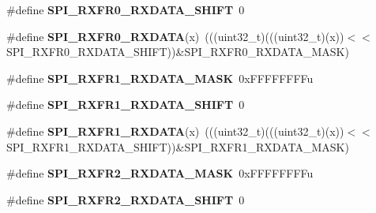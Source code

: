 \begin{DoxyCompactItemize}
\item 
\#define {\bfseries S\+P\+I\+\_\+\+R\+X\+F\+R0\+\_\+\+R\+X\+D\+A\+T\+A\+\_\+\+S\+H\+I\+FT}~0\hypertarget{group__SPI__Register__Masks_ga030988e177b7d3ab914b5bb4cd734463}{}\label{group__SPI__Register__Masks_ga030988e177b7d3ab914b5bb4cd734463}

\item 
\#define {\bfseries S\+P\+I\+\_\+\+R\+X\+F\+R0\+\_\+\+R\+X\+D\+A\+TA}(x)~(((uint32\+\_\+t)(((uint32\+\_\+t)(x))$<$$<$S\+P\+I\+\_\+\+R\+X\+F\+R0\+\_\+\+R\+X\+D\+A\+T\+A\+\_\+\+S\+H\+I\+FT))\&S\+P\+I\+\_\+\+R\+X\+F\+R0\+\_\+\+R\+X\+D\+A\+T\+A\+\_\+\+M\+A\+SK)\hypertarget{group__SPI__Register__Masks_gaefa909022ef28f93b77915a01f7456c6}{}\label{group__SPI__Register__Masks_gaefa909022ef28f93b77915a01f7456c6}

\item 
\#define {\bfseries S\+P\+I\+\_\+\+R\+X\+F\+R1\+\_\+\+R\+X\+D\+A\+T\+A\+\_\+\+M\+A\+SK}~0x\+F\+F\+F\+F\+F\+F\+F\+Fu\hypertarget{group__SPI__Register__Masks_gae5778ef350adb171937498b1b49ffdb0}{}\label{group__SPI__Register__Masks_gae5778ef350adb171937498b1b49ffdb0}

\item 
\#define {\bfseries S\+P\+I\+\_\+\+R\+X\+F\+R1\+\_\+\+R\+X\+D\+A\+T\+A\+\_\+\+S\+H\+I\+FT}~0\hypertarget{group__SPI__Register__Masks_gab6747e932cee7cbdab3b46213f8d793b}{}\label{group__SPI__Register__Masks_gab6747e932cee7cbdab3b46213f8d793b}

\item 
\#define {\bfseries S\+P\+I\+\_\+\+R\+X\+F\+R1\+\_\+\+R\+X\+D\+A\+TA}(x)~(((uint32\+\_\+t)(((uint32\+\_\+t)(x))$<$$<$S\+P\+I\+\_\+\+R\+X\+F\+R1\+\_\+\+R\+X\+D\+A\+T\+A\+\_\+\+S\+H\+I\+FT))\&S\+P\+I\+\_\+\+R\+X\+F\+R1\+\_\+\+R\+X\+D\+A\+T\+A\+\_\+\+M\+A\+SK)\hypertarget{group__SPI__Register__Masks_gac6df902214c0e119f65e494ad20d21c6}{}\label{group__SPI__Register__Masks_gac6df902214c0e119f65e494ad20d21c6}

\item 
\#define {\bfseries S\+P\+I\+\_\+\+R\+X\+F\+R2\+\_\+\+R\+X\+D\+A\+T\+A\+\_\+\+M\+A\+SK}~0x\+F\+F\+F\+F\+F\+F\+F\+Fu\hypertarget{group__SPI__Register__Masks_ga659737d6e82c6f3ace0e1d568157426f}{}\label{group__SPI__Register__Masks_ga659737d6e82c6f3ace0e1d568157426f}

\item 
\#define {\bfseries S\+P\+I\+\_\+\+R\+X\+F\+R2\+\_\+\+R\+X\+D\+A\+T\+A\+\_\+\+S\+H\+I\+FT}~0\hypertarget{group__SPI__Register__Masks_gac8d903abae42a6b97dcbdc5bf31b1276}{}\label{group__SPI__Register__Masks_gac8d903abae42a6b97dcbdc5bf31b1276}


\end{DoxyCompactItemize}
